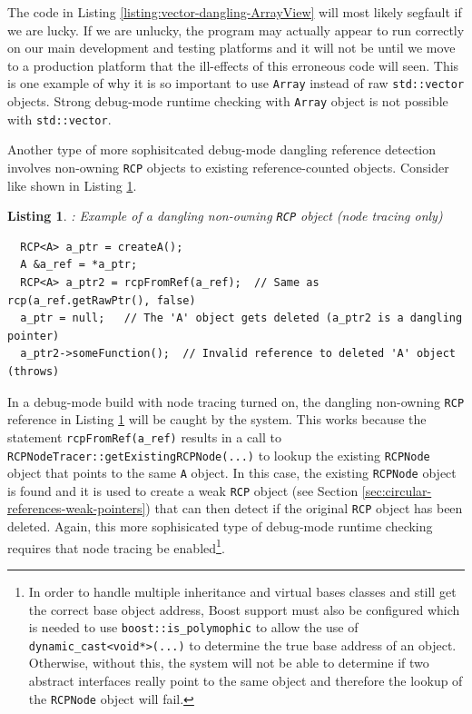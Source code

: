 \documentclass[pdf,ps2pdf,11pt]{SANDreport}
\newtheorem{listing}{Listing}
\begin{document}
The code in Listing {}\ref{listing:vector-dangling-ArrayView} will
most likely segfault if we are lucky.  If we are unlucky, the program
may actually appear to run correctly on our main development and
testing platforms and it will not be until we move to a production
platform that the ill-effects of this erroneous code will seen.  This
is one example of why it is so important to use {}\texttt{Array}
instead of raw {}\texttt{std::vector} objects.  Strong debug-mode
runtime checking with {}\texttt{Array} object is not possible with
{}\texttt{std::vector}.

Another type of more sophisitcated debug-mode dangling reference
detection involves non-owning {}\texttt{RCP} objects to existing
reference-counted objects.  Consider like shown in Listing
{}\ref{listing:RCP-nonowning-dangling-ref}.

\begin{listing}: Example of a dangling non-owning {}\texttt{RCP} object
(node tracing only) \\
\label{listing:RCP-nonowning-dangling-ref}
{\small\begin{verbatim}
  RCP<A> a_ptr = createA();
  A &a_ref = *a_ptr;
  RCP<A> a_ptr2 = rcpFromRef(a_ref);  // Same as rcp(a_ref.getRawPtr(), false)
  a_ptr = null;   // The 'A' object gets deleted (a_ptr2 is a dangling pointer)
  a_ptr2->someFunction();  // Invalid reference to deleted 'A' object (throws)
\end{verbatim}}
\end{listing}

In a debug-mode build with node tracing turned on, the dangling
non-owning {}\texttt{RCP} reference in Listing
{}\ref{listing:RCP-nonowning-dangling-ref} will be caught by the
system.  This works because the statement
{}\texttt{rcpFromRef(a\_ref)} results in a call to
{}\texttt{RCPNodeTracer::getExistingRCPNode(...)} to lookup the
existing {}\texttt{RCPNode} object that points to the same
{}\texttt{A} object.  In this case, the existing {}\texttt{RCPNode}
object is found and it is used to create a weak {}\texttt{RCP} object
(see Section {}\ref{sec:circular-references-weak-pointers}) that can
then detect if the original {}\texttt{RCP} object has been deleted.
Again, this more sophisicated type of debug-mode runtime checking
requires that node tracing be enabled\footnote{In order to handle
multiple inheritance and virtual bases classes and still get the
correct base object address, Boost support must also be configured
which is needed to use {}\texttt{boost::is\_polymophic} to allow the
use of {}\texttt{dynamic\_cast<void*>(...)} to determine the true base
address of an object.  Otherwise, without this, the system will not be
able to determine if two abstract interfaces really point to the same
object and therefore the lookup of the {}\texttt{RCPNode} object will
fail.}.
\end{document}
